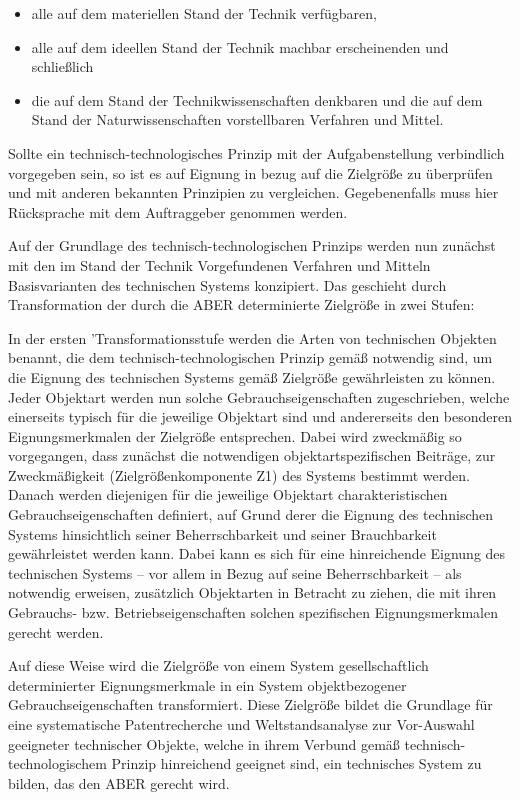 \documentclass[12pt,a4paper]{article}
\begin{document}
\begin{itemize}
\item alle auf dem materiellen Stand der Technik verfügbaren,
\item alle auf dem ideellen Stand der Technik machbar erscheinenden und
  schließlich
\item die auf dem Stand der Technikwissenschaften denkbaren und die auf dem
  Stand der Naturwissenschaften vorstellbaren Verfahren und Mittel.
\end{itemize}
Sollte ein technisch-technologisches Prinzip mit der Aufgabenstellung
verbindlich vorgegeben sein, so ist es auf Eignung in bezug auf die Zielgröße
zu überprüfen und mit anderen bekannten Prinzipien zu vergleichen.
Gegebenenfalls muss hier Rücksprache mit dem Auftraggeber genommen werden.

Auf der Grundlage des technisch-technologischen Prinzips werden nun zunächst
mit den im Stand der Technik Vorgefundenen Verfahren und Mitteln
Basisvarianten des technischen Systems konzipiert. Das geschieht durch
Transformation der durch die ABER determinierte Zielgröße in zwei Stufen:

In der ersten 'Transformationsstufe werden die Arten von technischen Objekten
benannt, die dem technisch-technologischen Prinzip gemäß notwendig sind, um
die Eignung des technischen Systems gemäß Zielgröße gewährleisten zu
können. Jeder Objektart werden nun solche Gebrauchseigenschaften
zugeschrieben, welche einerseits typisch für die jeweilige Objektart sind und
andererseits den besonderen Eignungsmerkmalen der Zielgröße entsprechen. Dabei
wird zweckmäßig so vorgegangen, dass zunächst die notwendigen
objektartspezifischen Beiträge, zur Zweckmäßigkeit (Zielgrößenkomponente Z1)
des Systems bestimmt werden. Danach werden diejenigen für die jeweilige
Objektart charakteristischen Gebrauchseigenschaften definiert, auf Grund derer
die Eignung des technischen Systems hinsichtlich seiner Beherrschbarkeit und
seiner Brauchbarkeit gewährleistet werden kann. Dabei kann es sich für eine
hinreichende Eignung des technischen Systems -- vor allem in Bezug auf seine
Beherrschbarkeit -- als notwendig erweisen, zusätzlich Objektarten in Betracht
zu ziehen, die mit ihren Gebrauchs- bzw. Betriebseigenschaften solchen
spezifischen Eignungsmerkmalen gerecht werden.

Auf diese Weise wird die Zielgröße von einem System gesellschaftlich
determinierter Eignungsmerkmale in ein System objektbezogener
Gebrauchseigenschaften transformiert. Diese Zielgröße bildet die Grundlage für
eine systematische Patentrecherche und Weltstandsanalyse zur Vor-Auswahl
geeigneter technischer Objekte, welche in ihrem Verbund gemäß
technisch-technologischem Prinzip hinreichend geeignet sind, ein technisches
System zu bilden, das den ABER gerecht wird.
\end{document}
